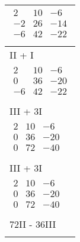 \begin{longtable}{p{10cm}}
    $\displaystyle\begin{matrix}
                          2  & 10 & -6  \\
                          -2 & 26 & -14 \\
                          -6 & 42 & -22 \\
                      \end{matrix}$                                                            \\\hline
    II + I                                                                                 \\\hline\pagebreak[0]
    $\displaystyle\begin{matrix}
                          2  & 10 & -6  \\
                          0  & 36 & -20 \\
                          -6 & 42 & -22 \\
                      \end{matrix}$                                                            \\\hline
    III + 3I                                                                               \\\hline\pagebreak[0]
    $\displaystyle\begin{matrix}
                          2 & 10 & -6  \\
                          0 & 36 & -20 \\
                          0 & 72 & -40 \\
                      \end{matrix}$                                                            \\\hline
    III + 3I                                                                               \\\hline\pagebreak[0]
    $\displaystyle\begin{matrix}
                          2 & 10 & -6  \\
                          0 & 36 & -20 \\
                          0 & 72 & -40 \\
                      \end{matrix}$                                                            \\\hline
    72II - 36III                                                                           \\\hline\pagebreak[0]

\end{longtable}
